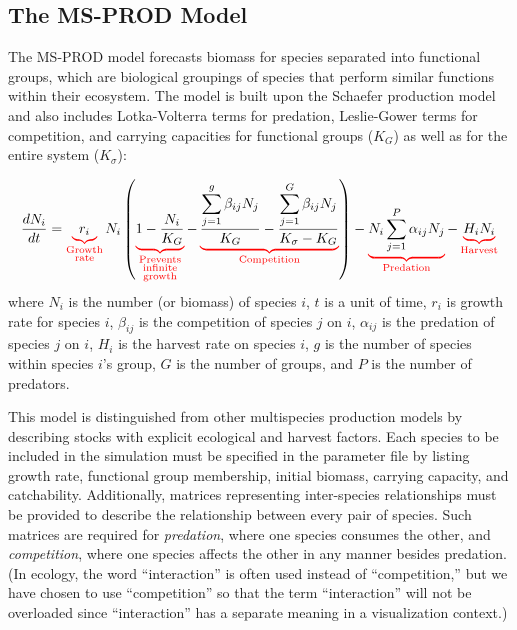 \subsection{The MS-PROD Model}

The MS-PROD model forecasts biomass for species separated into functional groups, which are biological groupings of species that perform similar functions within their ecosystem.  The model is built upon the Schaefer production model and also includes Lotka-Volterra terms for predation, Leslie-Gower terms for competition, and carrying capacities for functional groups ($K_G$) as well as for the entire system ($K_{\sigma}$):

\begin{equation}
\frac{d N_i}{dt} = \redub{r_i}_{\substack{\text{Growth}\\\text{rate}}} N_i \left(\redub{1 - \frac{N_i}{K_G}}_{\substack{\text{Prevents}\\\text{infinite}\\\text{growth}}} - \redub{\frac{\displaystyle\sum\limits_{j=1}^g \beta_{ij} N_j}{K_G} - \frac{\displaystyle\sum\limits_{j=1}^G \beta_{ij} N_j}{K_{\sigma} - K_G}}_{\substack{\text{Competition}}} \right) - \redub{N_i \displaystyle\sum\limits_{j=1}^P \alpha_{ij} N_j}_{\substack{\text{Predation}}} - \redub{H_i N_i}_{\substack{\text{Harvest}}}
\end{equation}
where $N_i$ is the number (or biomass) of species $i$, $t$ is a unit of time, $r_i$ is growth rate for species $i$, $\beta_{ij}$ is the competition of species $j$ on $i$, $\alpha_{ij}$ is the predation of species $j$ on $i$, $H_i$ is the harvest rate on species $i$, $g$ is the number of species within species $i$'s group, $G$ is the number of groups, and $P$ is the number of predators.

This model is distinguished from other multispecies production models by describing stocks with explicit ecological and harvest factors.  Each species to be included in the simulation must be specified in the parameter file by listing growth rate, functional group membership, initial biomass, carrying capacity, and catchability.  Additionally, matrices representing inter-species relationships must be provided to describe the relationship between every pair of species.  Such matrices are required for \textit{predation}, where one species consumes the other, and \textit{competition}, where one species affects the other in any manner besides predation.  (In ecology, the word ``interaction'' is often used instead of ``competition,'' but we have chosen to use ``competition'' so that the term ``interaction'' will not be overloaded since ``interaction'' has a separate meaning in a visualization context.)


